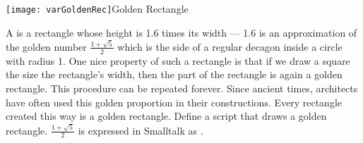 \begin{exofigwithsizeandtitle}[.8]{\texttt{[image: varGoldenRec]}}{Golden Rectangle}\label{exo:goldenrectangle}

A \newcommand{\replace}[2]{golden rectangle}{} is a rectangle whose height is 1.6 times its width
--- 1.6 is an approximation of the golden number $\frac{1 +
\sqrt{5}}{2}$\newcommand{\add}[1]{,} which is the side of a regular decagon inside a circle
\newcommand{\replace}[2]{of unity}{with radius 1}.  \newcommand{\replace}[2]{The}{One} nice property of such a rectangle is that if we draw
\newcommand{\remove}[1]{inside the rectangle} a square \newcommand{\replace}[2]{with}{the} size \newcommand{\add}[1]{of} the rectangle's width\newcommand{\add}[1]{ inside the rectangle}, then
the \newcommand{\remove}[1]{left} part of the rectangle \newcommand{\add}[1]{left outside the square} is again a golden rectangle. \newcommand{\replace}[2]{Such a
property is then infinite}{This procedure can be repeated forever}. \newcommand{\add}[1]{\paragraph
}
\newcommand{\replace}[2]{Ancient architects were using a lot such a}{Since ancient times, architects have often used this} golden proportion in their constructions. Every rectangle created this way is a
golden rectangle. \newcommand{\add}[1]{\paragraph
}
Define a script that draws a golden rectangle.
$\frac{1 + \sqrt{5}}{2}$ is expressed in Smalltalk as .

\end{exofigwithsizeandtitle}



